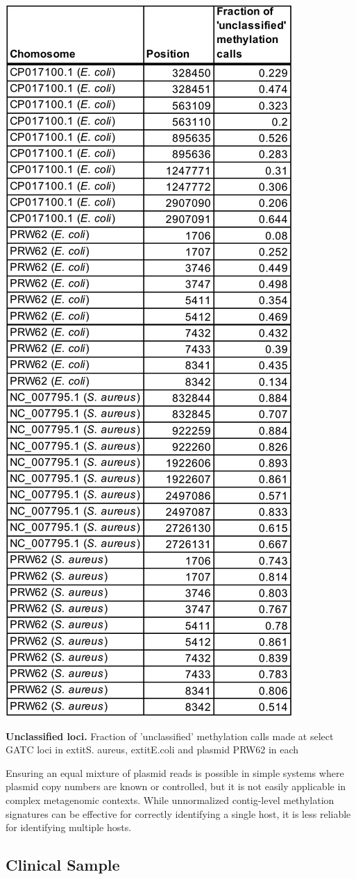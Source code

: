 \begin{table}[!hb]
\centering
\includegraphics[width = .5\linewidth,keepaspectratio]{figure/modprobs.pdf}
\caption[Unclassified loci]{{\bf Unclassified loci.} Fraction of 'unclassified' methylation calls made at select GATC loci in 	extit{S. aureus}, 	extit{E.coli} and plasmid PRW62 in each }
\label{tab:modprobs}
\end{table}


Ensuring an equal mixture of plasmid reads is possible in simple systems where plasmid copy numbers are known or controlled, but it is not easily applicable in complex metagenomic contexts. While unnormalized contig-level methylation signatures can be effective for correctly identifying a single host, it is less reliable for identifying multiple hosts.


\subsection{Clinical Sample}
\label{sec:mdr}


